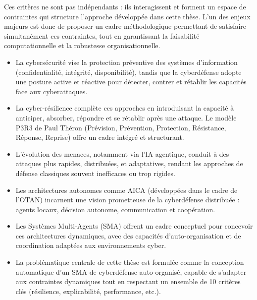 \documentclass[ twoside,openright,titlepage,numbers=noenddot,headinclude,%
                footinclude=true,cleardoublepage=empty,abstractoff, %
                BCOR=5mm,paper=a4,fontsize=11pt,%
                french,american,%
                ]{scrreprt}
\begin{document}
Ces critères ne sont pas indépendants : ils interagissent et forment un espace de contraintes qui structure l'approche développée dans cette thèse. L'un des enjeux majeurs est donc de proposer un cadre méthodologique permettant de satisfaire simultanément ces contraintes, tout en garantissant la faisabilité computationnelle et la robustesse organisationnelle.

\begin{tcolorbox}[colback=gray!5!white, colframe=gray!60!black, title={\faLightbulbO{} Points clés à retenir du Chapitre 1}]
    \begin{itemize}
        \item La cybersécurité vise la protection préventive des systèmes d'information (confidentialité, intégrité, disponibilité), tandis que la cyberdéfense adopte une posture active et réactive pour détecter, contrer et rétablir les capacités face aux cyberattaques.

        \item La cyber-résilience complète ces approches en introduisant la capacité à anticiper, absorber, répondre et se rétablir après une attaque. Le modèle P3R3 de Paul Théron (Prévision, Prévention, Protection, Résistance, Réponse, Reprise) offre un cadre intégré et structurant.

        \item L'évolution des menaces, notamment via l'IA agentique, conduit à des attaques plus rapides, distribuées, et adaptatives, rendant les approches de défense classiques souvent inefficaces ou trop rigides.

        \item Les architectures autonomes comme AICA (développées dans le cadre de l'OTAN) incarnent une vision prometteuse de la cyberdéfense distribuée : agents locaux, décision autonome, communication et coopération.

        \item Les Systèmes Multi-Agents (SMA) offrent un cadre conceptuel pour concevoir ces architectures dynamiques, avec des capacités d'auto-organisation et de coordination adaptées aux environnements cyber.

        \item La problématique centrale de cette thèse est formulée comme la conception automatique d'un SMA de cyberdéfense auto-organisé, capable de s'adapter aux contraintes dynamiques tout en respectant un ensemble de 10 critères clés (résilience, explicabilité, performance, etc.).
    \end{itemize}
\end{tcolorbox}
\end{document}
